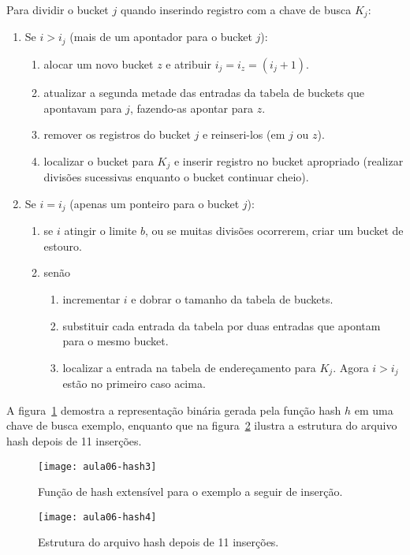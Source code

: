 Para dividir o bucket $j$ quando inserindo registro com a chave de busca $K_j$:
\begin{enumerate}
\item Se $i > i_j$ (mais de um apontador para o bucket $j$):
	\begin{enumerate}
	\item alocar um novo bucket $z$ e atribuir $i_j = i_z = (i_j+1)$.
	\item atualizar a segunda metade das entradas da tabela de 
	buckets que apontavam para $j$, fazendo-as apontar para $z$.
	\item remover os registros do bucket $j$ e reinseri-los 
	(em $j$ ou $z$).
	\item localizar o bucket para $K_j$ e inserir registro no bucket apropriado
	(realizar divisões sucessivas enquanto o bucket continuar cheio).
	\end{enumerate}

\item Se $i = i_j$ (apenas um ponteiro para o bucket $j$):
	\begin{enumerate}
	\item se $i$ atingir o limite $b$, ou se muitas divisões ocorrerem, criar um bucket
	de estouro.
	\item senão
		\begin{enumerate}
		\item incrementar $i$ e dobrar o tamanho da tabela de buckets.
		\item substituir cada entrada da tabela por duas entradas que
			apontam para o mesmo bucket.
		\item localizar a entrada na tabela de endereçamento para $K_j$.
		Agora $i > i_j$ estão no primeiro caso acima.
		\end{enumerate}
	\end{enumerate}

\end{enumerate}

A figura~\ref{aula06:fig:hash3} demostra a representação binária gerada pela função 
hash $h$ em uma chave de busca exemplo, enquanto que na figura~\ref{aula06:fig:hash4} ilustra
a estrutura do arquivo hash depois de 11 inserções.
%
\begin{figure}[!htb]
\centering
\texttt{[image: aula06-hash3]}
\caption{Função de hash extensível para o exemplo a seguir de inserção.}
\label{aula06:fig:hash3}
\end{figure}
%
\begin{figure}[!htb]
\centering
\texttt{[image: aula06-hash4]}
\caption{Estrutura do arquivo hash depois de 11 inserções.}
\label{aula06:fig:hash4}
\end{figure}


